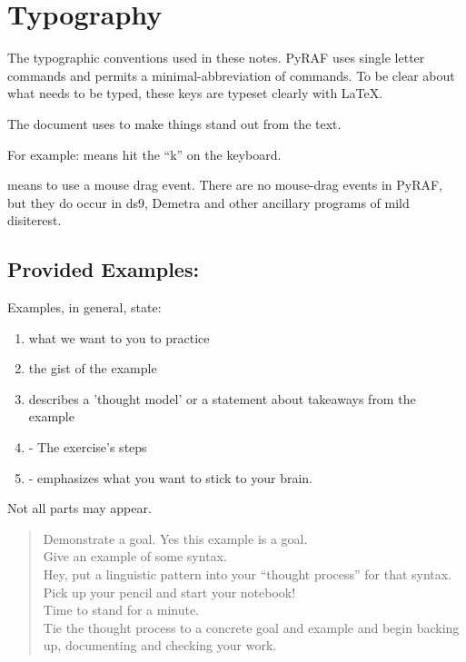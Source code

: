 \renewcommand\footerfilename{Typography.tex}

\section{Typography} \label{sec:Typography}

The typographic conventions used in these notes. PyRAF uses single letter
commands and permits a minimal-abbreviation of commands. To be clear about
what needs to be typed, these keys are typeset clearly with \LaTeX.

The document uses  to make  things stand
out from the text.

For example:  means hit the ``k'' on the keyboard. 

 means to use a mouse drag
event. There are no mouse-drag events in PyRAF, but they do occur in
ds9, Demetra and other ancillary programs of mild disiterest.


\subsection*{Provided Examples:}

Examples, in general, state:
\vspace{-.15cm}
\begin{enumerate}\addtolength{\itemsep}{-0.5\baselineskip}
   \item   {} what we want to you to practice
   \item   {} the gist of the example
   \item   {}  describes a 'thought model' or a statement about takeaways from the example
   \item   {} - The exercise's steps
   \item   {} - emphasizes what you want to stick to your brain.
\end{enumerate}

Not all parts may appear. 

\begin{quote}
\goal Demonstrate a goal. Yes this example is a goal.\\ \example Give
an example of some syntax.\\ \prose Hey, put a linguistic pattern into
your ``thought process'' for that syntax.\\ \exercise[-a] Pick up your
pencil and start your notebook! \\ \exercise[-b] Time to stand for a
minute. \\ \takeaway Tie the thought process to a concrete goal and
example and begin backing up, documenting and checking your work.
\end{quote}

